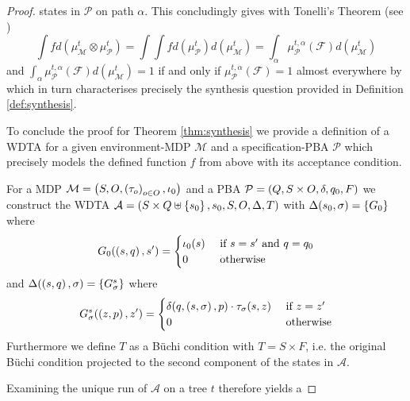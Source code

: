 \begin{proof}
states in $\mathcal{P}$ on path $\alpha$. This concludingly gives with
Tonelli's Theorem (see \cite[Theorem 23.6]{Bauer})
\begin{equation*}
  \int f d(\mu_{\mathcal{M}}^{t}\otimes\mu_{\mathcal{P}}^{t}) =
  \int\int f d(\mu_{\mathcal{P}}^{t})d(\mu_{\mathcal{M}}^{t}) =
  \int_{\alpha}\mu_{\mathcal{P}}^{t,\alpha}(\mathcal{F})d(\mu_{\mathcal{M}}^{t})
\end{equation*}
and $\int_{\alpha}\mu_{\mathcal{P}}^{t,\alpha}(\mathcal{F})
d(\mu_{\mathcal{M}}^{t}) = 1$ if and only if
$\mu_{\mathcal{P}}^{t,\alpha}(\mathcal{F}) = 1$ almost everywhere by
\cite[Lemma 40]{RandAutoInfTrees} which in turn characterises precisely the
synthesis question provided in Definition \ref{def:synthesis}.

To conclude the proof for Theorem \ref{thm:synthesis} we provide a definition
of a \ac{WDTA} for a given environment-\ac{MDP} $\mathcal{M}$ and a
specification-\ac{PBA} $\mathcal{P}$ which precisely models the defined
function $f$ from above with its acceptance condition.
\begin{definition}
  For a \ac{MDP} $\mathcal{M} = \left(S, O, \left(\tau_{o}\right)_{o\in O},
  \iota_{0}\right)$ and a \ac{PBA} $\mathcal{P} = \left(Q, S\times O, \delta, q_{0},
  F\right)$ we construct the \ac{WDTA}
  $\mathcal{A} = \left(S\times Q\uplus\left\{s_{0}\right\}, s_{0}, S, O, \Delta,
  T\right)$ with $\Delta(s_{0}, \sigma) = \left\{G_{0}\right\}$ where
  \begin{equation*}
    G_{0}(\left(s,q\right), s') =
    \begin{cases}
      \iota_{0}(s)&\text{ if }s = s'\text{ and }q = q_{0}\\
      0 &\text{ otherwise}
    \end{cases}
  \end{equation*}
  and $\Delta(\left(s, q\right), \sigma) = \left\{G^{s}_{\sigma}\right\}$ where
  \begin{equation*}
    G^{s}_{\sigma}(\left(z,p\right), z') =
    \begin{cases}
      \delta(q, \left(s,\sigma\right), p)\cdot\tau_{\sigma}(s,z)&\text{ if }z = z'\\
      0 &\text{ otherwise}
    \end{cases}
  \end{equation*}
  Furthermore we define $T$ as a Büchi condition with $T = S\times F$, i.e. the
  original Büchi condition projected to the second component of the
  states in $\mathcal{A}$.
\end{definition}
Examining the unique run of $\mathcal{A}$ on a tree $t$ therefore yields a

\end{proof}
